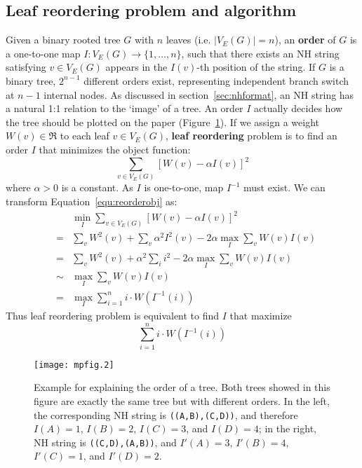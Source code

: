 \subsection{Leaf reordering problem and algorithm}
Given a binary rooted tree $G$ with $n$ leaves (i.e. $|V_E(G)|=n$), an {\bf order} of $G$ is a one-to-one
map $I: V_E(G)\rightarrow \{1,\ldots,n\}$, such that there exists an NH string satisfying $v\in V_E(G)$
appears in the $I(v)$-th position of the string. If $G$ is a binary tree,
$2^{n-1}$ different orders exist, representing independent branch switch at
$n-1$ internal nodes.
As discussed in section~\ref{sec:nhformat},
an NH string has a natural 1:1 relation to the `image' of a tree. An order $I$ actually
decides how the tree should be plotted on the paper (Figure~\ref{fig:orderexample}). If
we assign a weight $W(v)\in\Re$ to each leaf $v\in V_E(G)$, {\bf leaf reordering} problem
is to find an order $I$ that minimizes the object function:
\begin{equation}\label{equ:reorderobj}
\sum_{v\in V_E(G)}{[W(v)-\alpha I(v)]^2}
\end{equation}
where $\alpha>0$ is a constant. As $I$ is one-to-one, map $I^{-1}$ must exist.
We can transform Equation~\ref{equ:reorderobj} as:
\begin{eqnarray*}
&& \min_I\sum_{v\in V_E(G)}{[W(v)-\alpha I(v)]^2}\\
&=&\sum_v W^2(v)+\sum_v {\alpha^2 I^2(v)}- 2\alpha\max_I\sum_v{W(v)I(v)} \\
&=&\sum_v W^2(v) + \alpha^2\sum_i i^2 - 2\alpha\max_I\sum_v{W(v)I(v)} \\
&\sim& \max_I\sum_v{W(v)I(v)}\\
&=& \max_I\sum_{i=1}^n {i\cdot W(I^{-1}(i))}
\end{eqnarray*}
Thus leaf reordering problem is equivalent to find $I$ that maximize
\begin{equation}\label{equ:reorderobj2}
\sum_{i=1}^n {i\cdot W(I^{-1}(i))}
\end{equation}

\begin{figure}[!hb]
\begin{center}
\texttt{[image: mpfig.2]}
\end{center}
\caption[Example for explaining the order of a tree]{Example for explaining the order of a tree. Both trees showed in this figure are
exactly the same tree but with different orders. In the left, the corresponding NH string
is {\tt ((A,B),(C,D))}, and therefore $I(A)=1$, $I(B)=2$, $I(C)=3$, and $I(D)=4$;
in the right, NH string is {\tt ((C,D),(A,B))}, and $I'(A)=3$, $I'(B)=4$, $I'(C)=1$, and $I'(D)=2$.}
\label{fig:orderexample}
\end{figure}

